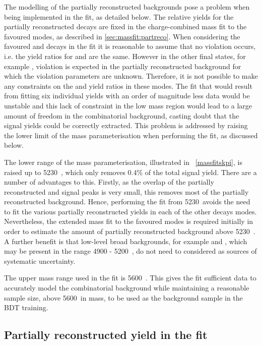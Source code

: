 The modelling of the partially reconstructed backgrounds pose a problem when being implemented in the \CP fit, as detailed below. The relative yields for the partially reconstructed decays are fixed in the charge-combined mass fit to the favoured modes, as described in \sect\ref{sec:massfit:partreco}. When considering the favoured \kpi and \kpipipi decays in the \CP fit it is reasonable to assume that no \CP violation occurs, i.e. the yield ratios for \Bm and \Bp are the same. However in the other \Dz final states, for example \pik, \CP violation is expected in the partially reconstructed background for which the \CP violation parameters are unknown. Therefore, it is not possible to make any constraints on the \Bp and \Bm yield ratios in these modes. The fit that would result from fitting six individual yields with an order of magnitude less data would be unstable and this lack of constraint in the low mass region would lead to a large amount of freedom in the combinatorial background, casting doubt that the signal yields could be correctly extracted. This problem is addressed by raising the lower limit of the \Bm mass parameterisation when performing the \CP fit, as discussed below.

The lower range of the mass parameterisation, illustrated in \fig~\ref{massfitskpi}, is raised up to 5230~\mevcc, which only removes 0.4\% of the total signal yield. There are a number of advantages to this. Firstly, as the overlap of the partially reconstructed and signal peaks is very small, this removes most of the partially reconstructed background. Hence, performing the \CP fit from 5230~\mevcc avoids the need to fit the various partially reconstructed yields in each of the other \Dz decays modes. Nevertheless, the extended mass fit to the favoured modes is required initially in order to estimate the amount of partially reconstructed background above 5230~\mevcc. A further benefit is that low-level broad backgrounds, for example \decay{\Bm}{\D\Kstarm\piz} and \decay{\Bd}{\Kp\pim\pip\pim}, which may be present in the range 4900 - 5200~\mevcc, do not need to considered as sources of systematic uncertainty. 

The upper mass range used in the \CP fit is 5600~\mevcc. This gives the fit sufficient data to accurately model the combinatorial background while maintaining a reasonable sample size, above 5600~\mevcc in \Bm mass, to be used as the background sample in the BDT training.

\subsection{Partially reconstructed yield in the \CP fit}
\label{sec:cpfit:partrecoyields}

